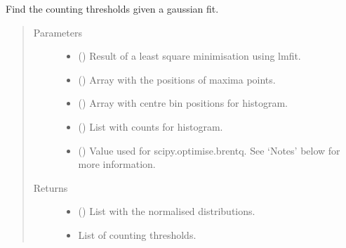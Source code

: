 \documentclass[letterpaper,10pt,english]{sphinxmanual}
\begin{document}
\begin{fulllineitems}
\label{\detokenize{tes:tes.calibration.find_thresholds}}
\sphinxAtStartPar
Find the counting thresholds given a gaussian fit.
\begin{quote}\begin{description}
\item[{Parameters}] \leavevmode\begin{itemize}
\item {} 
\sphinxAtStartPar
{} () \textendash{} Result of a least square minimisation using lmfit.

\item {} 
\sphinxAtStartPar
{} () \textendash{} Array with the positions of maxima points.

\item {} 
\sphinxAtStartPar
{} () \textendash{} Array with centre bin positions for histogram.

\item {} 
\sphinxAtStartPar
{} () \textendash{} List with counts for histogram.

\item {} 
\sphinxAtStartPar
{} () \textendash{} Value used for scipy.optimise.brentq.
See ‘Notes’ below for more information.

\end{itemize}

\item[{Returns}] \leavevmode
\sphinxAtStartPar
\begin{itemize}
\item {} 
\sphinxAtStartPar
{} () \textendash{} List with the normalised distributions.

\item {} 
\sphinxAtStartPar
{} \textendash{} List of counting thresholds.


\end{itemize}
\end{description}
\end{quote}
\end{fulllineitems}
\end{document}

